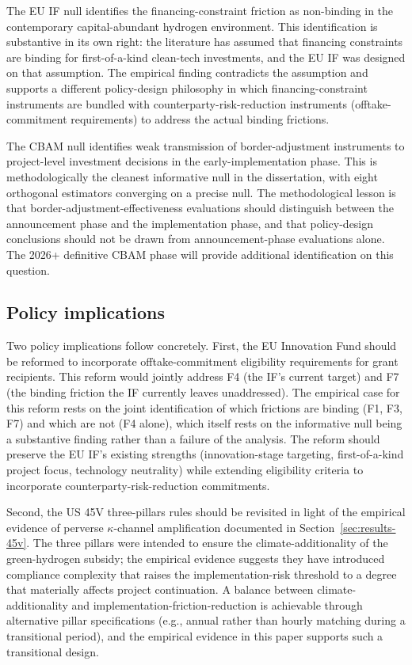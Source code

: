 \documentclass[12pt,a4paper]{article}
\theoremstyle{plain}
\theoremstyle{definition}
\begin{document}
The EU IF null identifies the financing-constraint friction as non-binding in the contemporary capital-abundant hydrogen environment. This identification is substantive in its own right: the literature has assumed that financing constraints are binding for first-of-a-kind clean-tech investments, and the EU IF was designed on that assumption. The empirical finding contradicts the assumption and supports a different policy-design philosophy in which financing-constraint instruments are bundled with counterparty-risk-reduction instruments (offtake-commitment requirements) to address the actual binding frictions.

The CBAM null identifies weak transmission of border-adjustment instruments to project-level investment decisions in the early-implementation phase. This is methodologically the cleanest informative null in the dissertation, with eight orthogonal estimators converging on a precise null. The methodological lesson is that border-adjustment-effectiveness evaluations should distinguish between the announcement phase and the implementation phase, and that policy-design conclusions should not be drawn from announcement-phase evaluations alone. The 2026+ definitive CBAM phase will provide additional identification on this question.

\subsection{Policy implications}
\label{sec:discussion-policy}

Two policy implications follow concretely. First, the EU Innovation Fund should be reformed to incorporate offtake-commitment eligibility requirements for grant recipients. This reform would jointly address F4 (the IF's current target) and F7 (the binding friction the IF currently leaves unaddressed). The empirical case for this reform rests on the joint identification of which frictions are binding (F1, F3, F7) and which are not (F4 alone), which itself rests on the informative null being a substantive finding rather than a failure of the analysis. The reform should preserve the EU IF's existing strengths (innovation-stage targeting, first-of-a-kind project focus, technology neutrality) while extending eligibility criteria to incorporate counterparty-risk-reduction commitments.

Second, the US 45V three-pillars rules should be revisited in light of the empirical evidence of perverse $\kappa$-channel amplification documented in Section~\ref{sec:results-45v}. The three pillars were intended to ensure the climate-additionality of the green-hydrogen subsidy; the empirical evidence suggests they have introduced compliance complexity that raises the implementation-risk threshold to a degree that materially affects project continuation. A balance between climate-additionality and implementation-friction-reduction is achievable through alternative pillar specifications (e.g., annual rather than hourly matching during a transitional period), and the empirical evidence in this paper supports such a transitional design.
\end{document}
